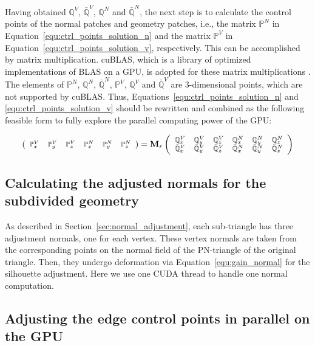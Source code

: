 \documentclass[3p]{elsarticle}
\begin{document}
Having obtained $\mathbb Q^V$, $\mathbb {\bar Q}^V$, $\mathbb Q^N$ and $\mathbb {\bar Q}^N$, the next step is to
calculate the control points of the normal patches and geometry patches, i.e., the matrix $\mathbb P^N$ in
Equation~\ref{equ:ctrl_points_solution_n} and the matrix $\mathbb P^V$ in Equation~\ref{equ:ctrl_points_solution_v},
respectively. This can be accomplished by matrix multiplication. cuBLAS, which is a library of optimized implementations
of BLAS on a GPU, is adopted for these matrix multiplications \cite{cublas}. The elements of $\mathbb P^N$, $\mathbb
Q^N$, $\mathbb {\bar Q}^N$, $\mathbb P^V$, $\mathbb Q^V$ and $\mathbb {\bar Q}^V$ are 3-dimensional points, which are
not supported by cuBLAS. Thus, Equations~\ref{equ:ctrl_points_solution_n} and \ref{equ:ctrl_points_solution_v} should be
rewritten and combined as the following feasible form to fully explore the parallel computing power of the GPU:

\begin{equation}
	\footnotesize
	\left(
		\begin{array}{cccccc}
			\mathbb P^V_x & \mathbb P^V_y & \mathbb P^V_z & \mathbb P^N_x & \mathbb P^N_y & \mathbb P^N_z
		\end{array}
	\right)
	=
	\mathbf M_r
	\left(
		\begin{array}{cccccc}
			\mathbb Q^V_x & \mathbb Q^V_y & \mathbb Q^V_z & \mathbb Q^N_x & \mathbb Q^N_y & \mathbb Q^N_z\\
			\mathbb {\bar Q}^V_x & \mathbb {\bar Q}^V_y & \mathbb {\bar Q}^V_z & \mathbb {\bar Q}^N_x & \mathbb {\bar Q}^N_y & \mathbb {\bar Q}^N_z
		\end{array}
	\right)
	\label{equ:ctrl_points_solution_combine}
\end{equation}

\subsection{Calculating the adjusted normals for the subdivided geometry}

As described in Section~\ref{sec:normal_adjustment}, each sub-triangle has three adjustment normals, one for each
vertex. These vertex normals are taken from the corresponding points on the normal field of the PN-triangle of the
original triangle. Then, they undergo deformation via Equation~\ref{equ:gain_normal} for the silhouette adjustment. Here
we use one CUDA thread to handle one normal computation.

\subsection{Adjusting the edge control points in parallel on the GPU}
\end{document}
